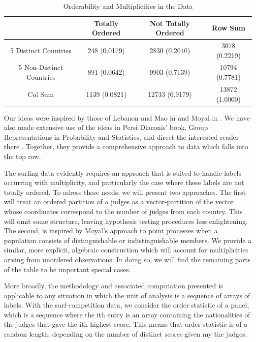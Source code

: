 \documentclass{article}
\begin{document}
\begin{table}
\caption{Orderability and Multiplicities in the Data }
\label{OrderAndMultOfData}
\begin{center} \begin{tabular}{|c|c|c|c|}
\hline
 & Totally Ordered & Not Totally Ordered & Row Sum  \\ 
\hline
5 Distinct Countries & 248 (0.0179)  & 2830 (0.2040) & 3078 (0.2219)  \\
5 Non-Distinct Countries & 891 (0.0642)  & 9903 (0.7139) & 10794 (0.7781) \\
\hline
Col Sum  & 1139 (0.0821) & 12733 (0.9179)&  13872 (1.0000)\\
\hline
\end{tabular} \end{center}
\end{table}

Our ideas were inspired by those of Lebanon and Mao in \cite{LebMao08} and Moyal in \cite{Moyal62}. We have also made extensive use of the ideas in Persi Diaconis' book, Group Representations in Probability and Statistics, and direct the interested reader there \cite{Diaconis88}. Together, they provide a comprehensive approach to data which falls into the top row.

The surfing data evidently requires an approach that is suited to handle labels occurring with multiplicity, and particularly the case where these labels are not totally ordered. To adress these needs, we will present two approaches. The first will treat an ordered partition of a judges as a vector-partition of the vector whose coordinates correspond to the number of judges from each country. This will omit some structure, leaving hypothesis testing procedures less enlightening. The second, is inspired by Moyal's approach to point processes when a population consists of distinguishable or indistinguishable members. We provide a similar, more explicit, algebraic construction which will account for multiplicities arising from unordered observations. In doing so, we will find the remaining parts of the table to be important special cases.

More broadly, the methodology and associated computation presented is applicable to any situation in which the unit of analysis is a sequence of arrays of labels. With the surf-competition data, we consider the order statistic of a panel, which is a sequence where the ith entry is an array containing the nationalities of the judges that gave the ith highest score. This means that order statistic is of a random length, depending on the number of distinct scores given my the judges.
\end{document}
